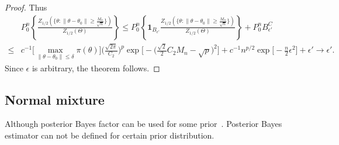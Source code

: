 \documentclass[3p]{elsarticle}
\theoremstyle{plain}
\theoremstyle{definition}
\theoremstyle{remark}
\begin{document}
\begin{proof}
     Thus
     $$
     \begin{aligned}
         &
         P_0^n \left\{ \frac{Z_{1/2} ( \{\theta: \|\theta-\theta_0\|\geq \frac{M_n}{\sqrt{n}}\})}{Z_{1/2}(\Theta)}
         \right\}
         \leq
         P_0^n \left\{ \mathbf{1}_{B_{\epsilon'}} \frac{Z_{1/2} ( \{\theta: \|\theta-\theta_0\|\geq \frac{M_n}{\sqrt{n}}\})}{Z_{1/2}(\Theta)}\right\}+
         P_0^n B_{\epsilon'}^C\\
          \leq&
         c^{-1}\Big[\max_{\|\theta-\theta_0\|\leq \delta} \pi(\theta)\Big]
\Big(\frac{\sqrt{2\pi}}{ C_2}\Big)^{p}
\exp\Big[-\big(\frac{\sqrt{2}}{2}C_2 M_n-\sqrt{p}\big)^2\Big]
        +
         c^{-1}n^{p/2}\exp\big[-\frac{n}{2}\epsilon^2\big]
         +\epsilon'
         \to \epsilon'.
     \end{aligned}
     $$
    Since $\epsilon $ is arbitrary, the theorem follows.
\end{proof}





\subsection{Normal mixture}

Although posterior Bayes factor can be used for some prior~\cite{Aitkin1996}.
Posterior Bayes estimator can not be defined for certain prior distribution.
\end{document}
